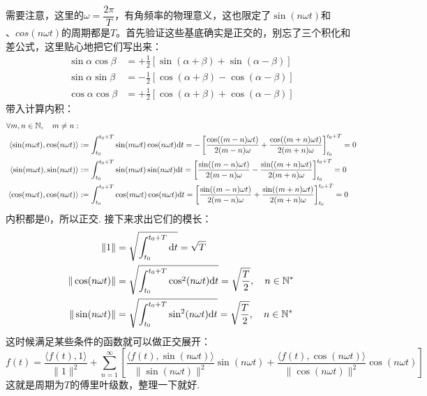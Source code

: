 \documentclass[main.tex]{subfiles}
\begin{document}
需要注意，这里的\(\omega=\dfrac{2\pi}{T}\)，有角频率的物理意义，这也限定了\(\sin(n\omega t)\)和\(、cos(n\omega t)\)的周期都是\(T\)。首先验证这些基底确实是正交的，别忘了三个积化和差公式，这里贴心地把它们写出来：
\begin{align*}
    \sin\alpha\cos\beta &= +\frac{1}{2}\left[\sin(\alpha+\beta)+\sin(\alpha-\beta)\right] \\
    \sin\alpha\sin\beta &= -\frac{1}{2}\left[\cos(\alpha+\beta)-\cos(\alpha-\beta)\right] \\
    \cos\alpha\cos\beta &= +\frac{1}{2}\left[\cos(\alpha+\beta)+\cos(\alpha-\beta)\right]
\end{align*}
带入计算内积：
\begin{align*}
    \forall m,n\in \mathbb{N},\quad m \neq n: & \\
    \langle \sin(m\omega t), \cos(n\omega t) \rangle &:= \int_{t_0}^{t_0+T} \sin(m\omega t)\cos(n\omega t) {\rm d}t = -\left[\frac{\cos((m-n)\omega t)}{2(m-n)\omega}+\frac{\cos((m+n)\omega t)}{2(m+n)\omega}\right]_{t_0}^{t_0+T} = 0 \\
    \langle \sin(m\omega t), \sin(n\omega t) \rangle &:= \int_{t_0}^{t_0+T} \sin(m\omega t)\sin(n\omega t) {\rm d}t = \left[\frac{\sin((m-n)\omega t)}{2(m-n)\omega}-\frac{\sin((m+n)\omega t)}{2(m+n)\omega}\right]_{t_0}^{t_0+T} = 0 \\
    \langle \cos(m\omega t), \cos(n\omega t) \rangle &:= \int_{t_0}^{t_0+T} \cos(m\omega t)\cos(n\omega t) {\rm d}t = \left[\frac{\sin((m-n)\omega t)}{2(m-n)\omega}+\frac{\sin((m+n)\omega t)}{2(m+n)\omega}\right]_{t_0}^{t_0+T} = 0
\end{align*}
内积都是0，所以正交. 接下来求出它们的模长：
\begin{align*}
    \|1\| &= \sqrt{\int_{t_0}^{t_0+T}{\rm d}t} = \sqrt{T} \\
    \|\cos(n\omega t)\| &= \sqrt{\int_{t_0}^{t_0+T} \cos^2(n\omega t) {\rm d}t} = \sqrt{\frac{T}{2}},\quad n \in \mathbb{N}^* \\
    \|\sin(n\omega t)\| &= \sqrt{\int_{t_0}^{t_0+T} \sin^2(n\omega t) {\rm d}t} = \sqrt{\frac{T}{2}},\quad n \in \mathbb{N}^*
\end{align*}
这时候满足某些条件的函数就可以做正交展开：
\[f(t) = \frac{\langle f(t), 1 \rangle}{\|1\|^2} + \sum_{n=1}^{\infty} \left[\frac{\langle f(t), \sin(n\omega t) \rangle}{\|\sin(n\omega t)\|^2}\sin(n\omega t) + \frac{\langle f(t), \cos(n\omega t) \rangle}{\|\cos(n\omega t)\|^2}\cos(n\omega t)\right]\]
这就是周期为\(T\)的傅里叶级数，整理一下就好.
\end{document}

